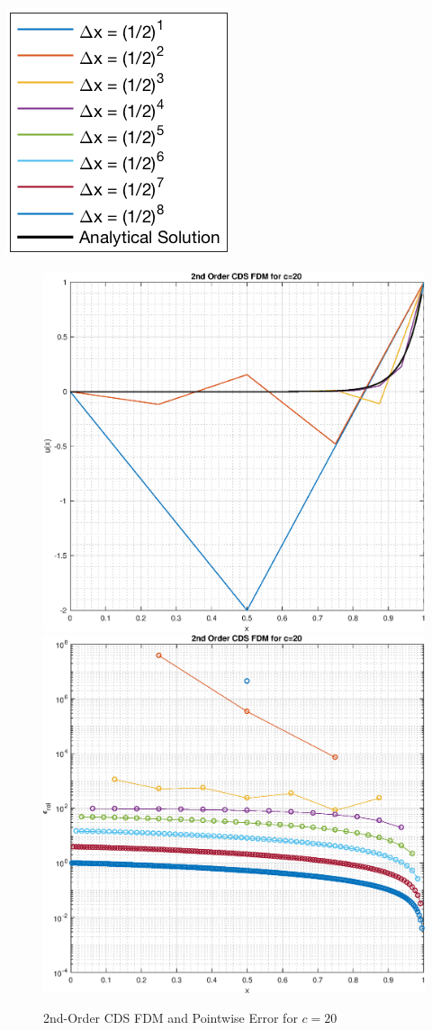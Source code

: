 \documentclass[10pt, reqno]{article}		%
\numberwithin{equation}{section}
\begin{document}
\begin{center}
	\includegraphics[height = 0.25\linewidth]{legend}
\end{center}

\newpage

\begin{figure}[H]
	\begin{center}
		\includegraphics[width = 0.49\linewidth]{solution_2nd_order_cds_c_20}
		\includegraphics[width = 0.49\linewidth]{pointwise_error_2nd_order_cds_c_20}
		\caption{2nd-Order CDS FDM and Pointwise Error for $c = 20$}
	\end{center}
\end{figure}
\end{document}
